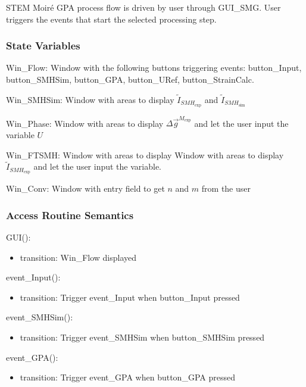 \documentclass[12pt, titlepage]{article}
\newcommand{\progname}{STEM Moir{\'e} GPA}
\begin{document}
\progname{} process flow is driven by user through GUI{\_}SMG. User triggers the events that start the selected processing step. 

\subsubsection{State Variables}

Win{\_}Flow: Window with the following buttons triggering events: button{\_}Input, button{\_}SMHSim, button{\_}GPA, button{\_}URef, button{\_}StrainCalc.

Win{\_}SMHSim: Window with areas to display $\widetilde{I}_{\mathit{SMH}_{\text{exp}}}$ and $\widetilde{I}_{\mathit{SMH}_{\text{sim}}}$

Win{\_}Phase: Window with areas to display $\Delta \overrightarrow{g}^{M_{\text{exp}}}$ and let the user input the variable $U$

Win{\_}FTSMH: Window with areas to display Window with areas to display $\widetilde{I}_{\mathit{SMH}_{\text{exp}}}$ and let the user input the variable.

Win{\_}Conv: Window with entry field to get $n$ and $m$ from the user


\subsubsection{Access Routine Semantics}

\noindent GUI():
\begin{itemize}
\item transition: Win{\_}Flow displayed 
\end{itemize}

\noindent event{\_}Input():
\begin{itemize}
\item transition: Trigger event{\_}Input when button{\_}Input pressed
\end{itemize}

\noindent event{\_}SMHSim():
\begin{itemize}
\item transition: Trigger event{\_}SMHSim when button{\_}SMHSim pressed
\end{itemize}

\noindent event{\_}GPA():
\begin{itemize}
\item transition: Trigger event{\_}GPA when button{\_}GPA pressed
\end{itemize}
\end{document}
